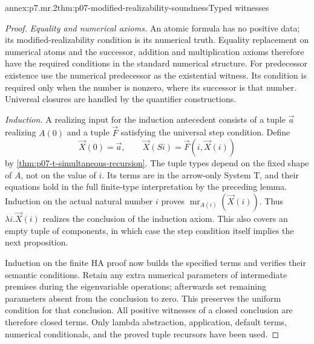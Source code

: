 \begin{annexitem}{annex:p7.mr.2}{thm:p07-modified-realizability-soundness}{Typed witnesses}
\begin{proof}
\emph{Equality and numerical axioms.} An atomic formula has no
positive data; its modified-realizability condition is its numerical
truth. Equality replacement on numerical atoms and the successor,
addition and multiplication axioms therefore have the required
conditions in the standard numerical structure. For predecessor
existence use the numerical predecessor as the existential witness.
Its condition is required only when the number is nonzero, where its
successor is that number. Universal closures are handled by the
quantifier constructions.

\emph{Induction.} A realizing input for the induction antecedent
consists of a tuple \(\vec a\) realizing \(A(0)\) and a tuple
\(\vec F\) satisfying the universal step condition. Define
\[
 \vec X(0)=\vec a,\qquad
 \vec X(Si)=\vec F(i,\vec X(i))
\]
by \cref{thm:p07-t-simultaneous-recursion}. The tuple types depend
on the fixed shape of \(A\), not on the value of \(i\). Its terms are in the
arrow-only System T, and their equations hold in the full finite-type
interpretation by the preceding lemma. Induction on the actual natural
number \(i\) proves \(\operatorname{mr}_{A(i)}(\vec X(i))\).
Thus \(\lambda i.\vec X(i)\) realizes the conclusion of the
induction axiom. This also covers an empty tuple of components, in
which case the step condition itself implies the next proposition.

Induction on the finite HA proof now builds the specified terms and
verifies their semantic conditions. Retain any extra numerical
parameters of intermediate premises during the eigenvariable operations;
afterwards set remaining parameters absent from the conclusion to zero.
This preserves the uniform condition for that conclusion. All positive
witnesses of a closed conclusion are therefore closed terms. Only
lambda abstraction, application, default terms, numerical conditionals,
and the proved tuple recursors have been used.
\end{proof}
\end{annexitem}

